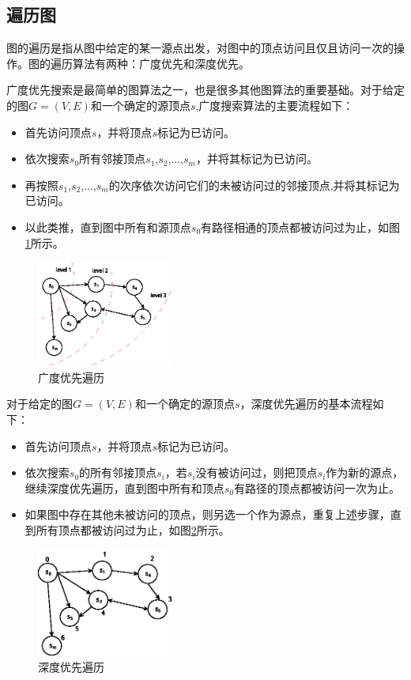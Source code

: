 \subsection{遍历图}
图的遍历是指从图中给定的某一源点出发，对图中的顶点访问且仅且访问一次的操作。图的遍历算法有两种：广度优先和深度优先。

广度优先搜索是最简单的图算法之一，也是很多其他图算法的重要基础。对于给定的图$G=(V,E)$和一个确定的源顶点$s$,广度搜索算法的主要流程如下：
\begin{itemize}
\item 首先访问顶点$s$，并将顶点$s$标记为已访问。
\item 依次搜索$s_0$所有邻接顶点$s_1$,$s_2$,...,$s_m$，并将其标记为已访问。
\item 再按照$s_1$,$s_2$,...,$s_m$的次序依次访问它们的未被访问过的邻接顶点,并将其标记为已访问。
\item 以此类推，直到图中所有和源顶点$s_0$有路径相通的顶点都被访问过为止，如图\ref{fig:graphbfs}所示。
\end{itemize}

\begin{figure}[htbp]
\centering
\includegraphics[width=0.4\textwidth]{myfigures/graphbfs}
\caption{广度优先遍历}\label{fig:graphbfs}
\vspace{\baselineskip}
\end{figure}

对于给定的图$G=(V,E)$和一个确定的源顶点$s$，深度优先遍历的基本流程如下：
\begin{itemize}
\item 首先访问顶点$s$，并将顶点$s$标记为已访问。
\item 依次搜索$s_0$的所有邻接顶点$s_i$，若$s_i$没有被访问过，则把顶点$s_i$作为新的源点，继续深度优先遍历，直到图中所有和顶点$s_0$有路径的顶点都被访问一次为止。
\item 如果图中存在其他未被访问的顶点，则另选一个作为源点，重复上述步骤，直到所有顶点都被访问过为止，如图\ref{fig:graphdfs}所示。
\end{itemize}

\begin{figure}[htbp]
\centering
\includegraphics[width=0.4\textwidth]{myfigures/graphdfs}
\caption{深度优先遍历}\label{fig:graphdfs}
\vspace{\baselineskip}
\end{figure}

